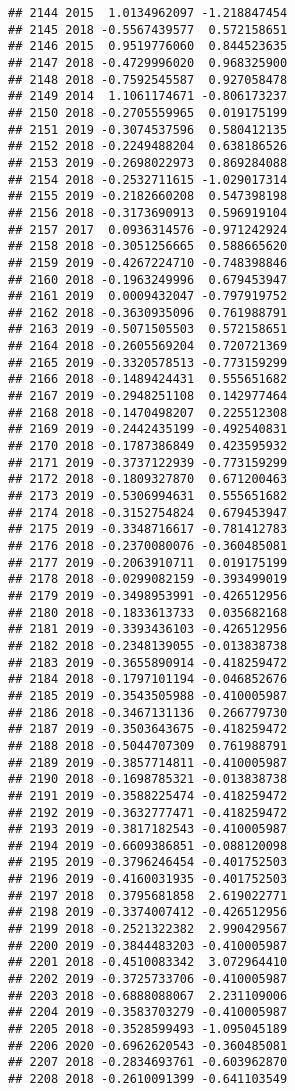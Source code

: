 \documentclass[
]{article}
\begin{document}
\begin{verbatim}
## 2144 2015  1.0134962097 -1.218847454
## 2145 2018 -0.5567439577  0.572158651
## 2146 2015  0.9519776060  0.844523635
## 2147 2018 -0.4729996020  0.968325900
## 2148 2018 -0.7592545587  0.927058478
## 2149 2014  1.1061174671 -0.806173237
## 2150 2018 -0.2705559965  0.019175199
## 2151 2019 -0.3074537596  0.580412135
## 2152 2018 -0.2249488204  0.638186526
## 2153 2019 -0.2698022973  0.869284088
## 2154 2018 -0.2532711615 -1.029017314
## 2155 2019 -0.2182660208  0.547398198
## 2156 2018 -0.3173690913  0.596919104
## 2157 2017  0.0936314576 -0.971242924
## 2158 2018 -0.3051256665  0.588665620
## 2159 2019 -0.4267224710 -0.748398846
## 2160 2018 -0.1963249996  0.679453947
## 2161 2019  0.0009432047 -0.797919752
## 2162 2018 -0.3630935096  0.761988791
## 2163 2019 -0.5071505503  0.572158651
## 2164 2018 -0.2605569204  0.720721369
## 2165 2019 -0.3320578513 -0.773159299
## 2166 2018 -0.1489424431  0.555651682
## 2167 2019 -0.2948251108  0.142977464
## 2168 2018 -0.1470498207  0.225512308
## 2169 2019 -0.2442435199 -0.492540831
## 2170 2018 -0.1787386849  0.423595932
## 2171 2019 -0.3737122939 -0.773159299
## 2172 2018 -0.1809327870  0.671200463
## 2173 2019 -0.5306994631  0.555651682
## 2174 2018 -0.3152754824  0.679453947
## 2175 2019 -0.3348716617 -0.781412783
## 2176 2018 -0.2370080076 -0.360485081
## 2177 2019 -0.2063910711  0.019175199
## 2178 2018 -0.0299082159 -0.393499019
## 2179 2019 -0.3498953991 -0.426512956
## 2180 2018 -0.1833613733  0.035682168
## 2181 2019 -0.3393436103 -0.426512956
## 2182 2018 -0.2348139055 -0.013838738
## 2183 2019 -0.3655890914 -0.418259472
## 2184 2018 -0.1797101194 -0.046852676
## 2185 2019 -0.3543505988 -0.410005987
## 2186 2018 -0.3467131136  0.266779730
## 2187 2019 -0.3503643675 -0.418259472
## 2188 2018 -0.5044707309  0.761988791
## 2189 2019 -0.3857714811 -0.410005987
## 2190 2018 -0.1698785321 -0.013838738
## 2191 2019 -0.3588225474 -0.418259472
## 2192 2019 -0.3632777471 -0.418259472
## 2193 2019 -0.3817182543 -0.410005987
## 2194 2019 -0.6609386851 -0.088120098
## 2195 2019 -0.3796246454 -0.401752503
## 2196 2019 -0.4160031935 -0.401752503
## 2197 2018  0.3795681858  2.619022771
## 2198 2019 -0.3374007412 -0.426512956
## 2199 2018 -0.2521322382  2.990429567
## 2200 2019 -0.3844483203 -0.410005987
## 2201 2018 -0.4510083342  3.072964410
## 2202 2019 -0.3725733706 -0.410005987
## 2203 2018 -0.6888088067  2.231109006
## 2204 2019 -0.3583703279 -0.410005987
## 2205 2018 -0.3528599493 -1.095045189
## 2206 2020 -0.6962620543 -0.360485081
## 2207 2018 -0.2834693761 -0.603962870
## 2208 2018 -0.2610091399 -0.641103549

\end{verbatim}
\end{document}
